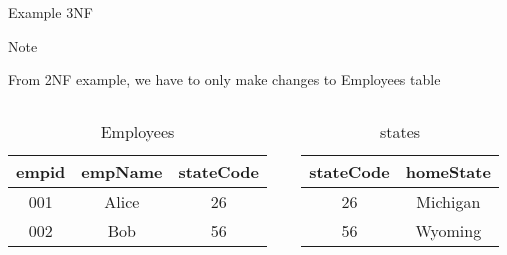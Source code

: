 \documentclass[12pt, aspectratio=169]{beamer}
\begin{document}
\begin{frame}{Example 3NF}
    \begin{alertblock}{Note}
    
        From 2NF example, we have to only make changes to Employees table
    \end{alertblock}
    
    \begin{columns}[onlytextwidth, T]
    \begin{column}{0.5\linewidth}
            \begin{table}
                \caption{Employees}
                    \begin{tabular}{ccc}
                      \toprule
                      empid & empName & stateCode \\
                      \midrule
                      001 & Alice & 26 \\
                      002 & Bob & 56 \\
                    \bottomrule
                  \end{tabular}
                \end{table}
            \end{column}
            \begin{column}{0.5\linewidth}
                \begin{table}
                \caption{states}
                    \begin{tabular}{cc}
                      \toprule
                     stateCode & homeState \\
                      \midrule
                      26 & Michigan \\
                      56 & Wyoming \\
                    \bottomrule
                  \end{tabular}
                \end{table}
            \end{column}
    \end{columns}
\end{frame}

\end{document}
